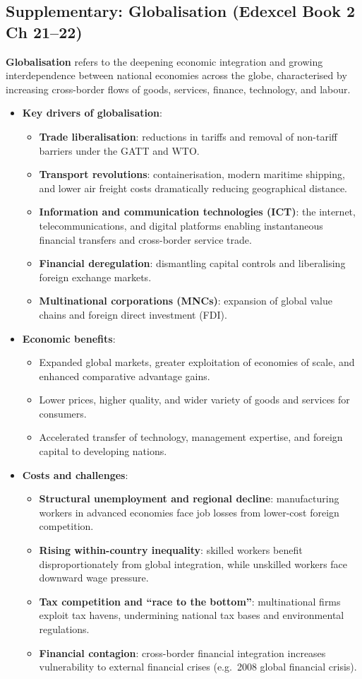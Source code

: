 \documentclass[a4paper,12pt]{article}
\newcommand{\needbold}[1]{\textcolor{red!70!black}{\textbf{#1}}}
\begin{document}
\subsection{Supplementary: Globalisation (Edexcel Book 2 Ch 21--22)}
\needbold{Globalisation} refers to the deepening economic integration and growing interdependence between national economies across the globe, characterised by increasing cross-border flows of goods, services, finance, technology, and labour.
\begin{itemize}
  \item \textbf{Key drivers of globalisation}:
  \begin{itemize}
    \item \textbf{Trade liberalisation}: reductions in tariffs and removal of non-tariff barriers under the GATT and WTO.
    \item \textbf{Transport revolutions}: containerisation, modern maritime shipping, and lower air freight costs dramatically reducing geographical distance.
    \item \textbf{Information and communication technologies (ICT)}: the internet, telecommunications, and digital platforms enabling instantaneous financial transfers and cross-border service trade.
    \item \textbf{Financial deregulation}: dismantling capital controls and liberalising foreign exchange markets.
    \item \textbf{Multinational corporations (MNCs)}: expansion of global value chains and foreign direct investment (FDI).
  \end{itemize}
  \item \textbf{Economic benefits}:
  \begin{itemize}
    \item Expanded global markets, greater exploitation of economies of scale, and enhanced comparative advantage gains.
    \item Lower prices, higher quality, and wider variety of goods and services for consumers.
    \item Accelerated transfer of technology, management expertise, and foreign capital to developing nations.
  \end{itemize}
  \item \textbf{Costs and challenges}:
  \begin{itemize}
    \item \textbf{Structural unemployment and regional decline}: manufacturing workers in advanced economies face job losses from lower-cost foreign competition.
    \item \textbf{Rising within-country inequality}: skilled workers benefit disproportionately from global integration, while unskilled workers face downward wage pressure.
    \item \textbf{Tax competition and ``race to the bottom''}: multinational firms exploit tax havens, undermining national tax bases and environmental regulations.
    \item \textbf{Financial contagion}: cross-border financial integration increases vulnerability to external financial crises (e.g.\ 2008 global financial crisis).
  \end{itemize}
\end{itemize}
\end{document}
